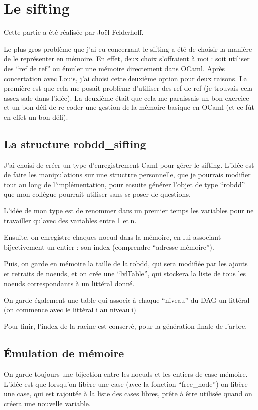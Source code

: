 \documentclass[a4paper,10pt]{article}
\begin{document}
\section{Le sifting}
Cette partie a été réalisée par Joël Felderhoff.

Le plus gros problème que j'ai eu concernant le sifting a été de choisir la manière de le représenter en mémoire.
En effet, deux choix s'offraient à moi : soit utiliser des ``ref de ref'' ou émuler une mémoire directement dans OCaml. Après concertation avec Louis, j'ai choisi
cette deuxième option pour deux raisons. La première est que cela me posait problème d'utiliser des ref de ref (je trouvais cela assez sale dans l'idée). La deuxième était que cela me
paraissais un bon exercice et un bon défi de re-coder une gestion de la mémoire basique en OCaml (et ce fût en effet un bon défi).

\subsection{La structure robdd\_sifting}
J'ai choisi de créer un type d'enregistrement Caml pour gérer le sifting. L'idée est de faire les manipulations sur une structure personnelle, que je pourrais modifier tout au long de 
l'implémentation, pour ensuite générer l'objet de type ``robdd'' que mon collègue pourrait utiliser sans se poser de questions.

L'idée de mon type est de renommer dans un premier temps les variables pour ne travailler qu'avec des variables entre 1 et n.

Ensuite, on enregistre chaques noeud dans la mémoire, en lui associant bijectivement un entier : son index (comprendre ``adresse mémoire''). 

Puis, on garde en mémoire la taille de la robdd, qui sera modifiée par les ajouts et retraits de noeuds, et on crée une ``lvlTable'', qui stockera la liste de tous les noeuds correspondants à un 
littéral donné.

On garde également une table qui associe à chaque ``niveau'' du DAG un littéral (on commence avec le littéral i au niveau i)

Pour finir, l'index de la racine est conservé, pour la génération finale de l'arbre.

\subsection{Émulation de mémoire}
On garde toujours une bijection entre les noeuds et les entiers de case mémoire. L'idée est que lorsqu'on libère une case (avec la fonction ``free\_node'') on libère une case, qui est rajoutée à la liste des 
cases libres, prête à être utilisée quand on créera une nouvelle variable.
\end{document}
